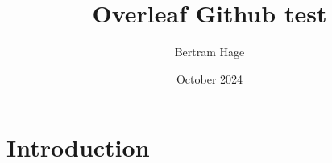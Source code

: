 \documentclass{article}
\title{Overleaf Github test}
\author{Bertram Hage}
\date{October 2024}
\begin{document}
\maketitle

\section{Introduction}
\end{document}
